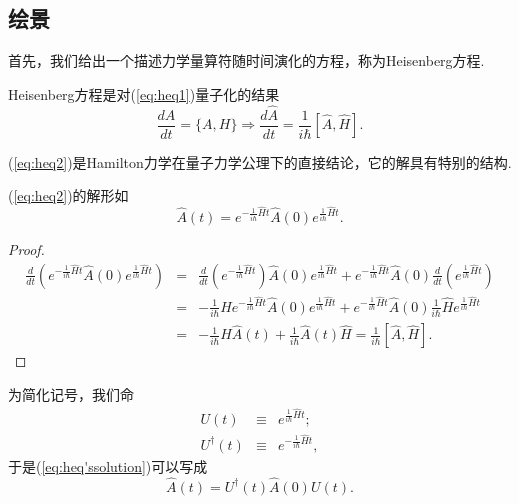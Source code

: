		\subsection{绘景}
			首先，我们给出一个描述力学量算符随时间演化的方程，称为Heisenberg方程.
			\begin{definition}Heisenberg方程是对(\ref{eq:heq1})量子化的结果
				\begin{equation}\label{eq:heq2}
					\frac{dA}{dt}=\{A,H\}\Rightarrow\frac{d\hat{A}}{dt}=\frac{1}{i\hbar}[\hat{A},\hat{H}].
				\end{equation}
			\end{definition}
			(\ref{eq:heq2})是Hamilton力学在量子力学公理下的直接结论，它的解具有特别的结构.
			\begin{lemma}
				(\ref{eq:heq2})的解形如
				\begin{equation}\label{eq:heq'ssolution}
					\hat{A}(t)=e^{-\frac{1}{i\hbar}\hat{H}t}\hat{A}(0)e^{\frac{1}{i\hbar}\hat{H}t}.
				\end{equation}
				
			\end{lemma}
			\begin{proof}
				\begin{eqnarray*}
					\frac{d}{d t}\left(e^{-\frac{1}{i \hbar} \hat{H} t} \hat{A}(0) e^{\frac{1}{i \hbar} \hat{H} t}\right)&=&\frac{d}{d t}\left(e^{-\frac{1}{i \hbar}\hat{H} t}\right)\hat{A}(0) e^{\frac{1}{i \hbar} \hat{H} t}+e^{-\frac{1}{i \hbar} \hat{H} t} \hat{A}(0) \frac{d}{d t}\left(e^{\frac{1}{i \hbar} \hat{H} t}\right)\\
					&=&-\frac{1}{i \hbar} \hat{H} e^{-\frac{1}{i \hbar} \hat{H} t} \hat{A}(0) e^{\frac{1}{i \hbar} \hat{H} t}+e^{-\frac{1}{i \hbar} \hat{H} t} \hat{A}(0) \frac{1}{i \hbar} \hat{H} e^{\frac{1}{i \hbar} \hat{H} t} \\
					&=&-\frac{1}{i \hbar} \hat{H} \hat{A}(t)+\frac{1}{i \hbar} \hat{A}(t) \hat{H}=\frac{1}{i \hbar}[\hat{A}, \hat{H}].
				\end{eqnarray*}
			\end{proof}
			\begin{remark}
				为简化记号，我们命
			\begin{eqnarray*}
				U(t)&\equiv&e^{\frac{1}{i \hbar} \hat{H} t};\\
				U^\dagger (t)&\equiv&e^{-\frac{1}{i \hbar} \hat{H} t},
			\end{eqnarray*}
			于是(\ref{eq:heq'ssolution})可以写成
			\begin{equation}\label{eq:heq'ssolution2}
				\hat{A}(t)=U^\dagger(t)\hat{A}(0)U(t).
			\end{equation}
			\end{remark}
			
